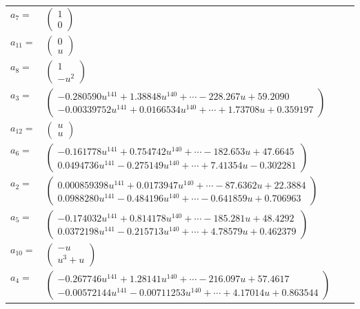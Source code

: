 \documentclass[1p]{elsarticle_modified}
\theoremstyle{definition}
\begin{document}
\begin{tabular}{m{7pt} m{180pt} m{7pt} m{180pt} }
\flushright $a_{7}=$&$\begin{pmatrix}1\\0\end{pmatrix}$ \\
\flushright $a_{11}=$&$\begin{pmatrix}0\\u\end{pmatrix}$ \\
\flushright $a_{8}=$&$\begin{pmatrix}1\\- u^2\end{pmatrix}$ \\
\flushright $a_{3}=$&$\begin{pmatrix}-0.280590 u^{141}+1.38848 u^{140}+\cdots-228.267 u+59.2090\\-0.00339752 u^{141}+0.0166534 u^{140}+\cdots+1.73708 u+0.359197\end{pmatrix}$ \\
\flushright $a_{12}=$&$\begin{pmatrix}u\\u\end{pmatrix}$ \\
\flushright $a_{6}=$&$\begin{pmatrix}-0.161778 u^{141}+0.754742 u^{140}+\cdots-182.653 u+47.6645\\0.0494736 u^{141}-0.275149 u^{140}+\cdots+7.41354 u-0.302281\end{pmatrix}$ \\
\flushright $a_{2}=$&$\begin{pmatrix}0.000859398 u^{141}+0.0173947 u^{140}+\cdots-87.6362 u+22.3884\\0.0988280 u^{141}-0.484196 u^{140}+\cdots-0.641859 u+0.706963\end{pmatrix}$ \\
\flushright $a_{5}=$&$\begin{pmatrix}-0.174032 u^{141}+0.814178 u^{140}+\cdots-185.281 u+48.4292\\0.0372198 u^{141}-0.215713 u^{140}+\cdots+4.78579 u+0.462379\end{pmatrix}$ \\
\flushright $a_{10}=$&$\begin{pmatrix}- u\\u^3+u\end{pmatrix}$ \\
\flushright $a_{4}=$&$\begin{pmatrix}-0.267746 u^{141}+1.28141 u^{140}+\cdots-216.097 u+57.4617\\-0.00572144 u^{141}-0.00711253 u^{140}+\cdots+4.17014 u+0.863544\end{pmatrix}$ \\

\end{tabular}
\end{document}
